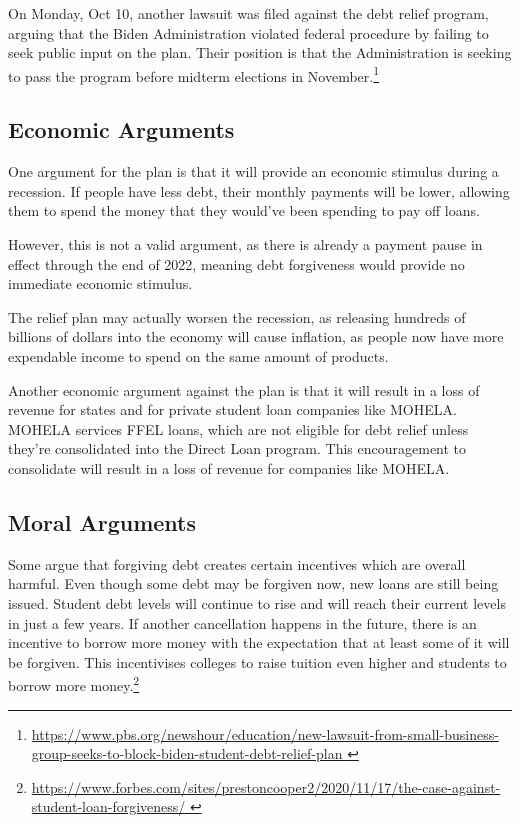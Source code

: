 \documentclass{../khw}
\begin{document}
On Monday, Oct 10, another lawsuit was filed against the debt
relief program, arguing that the Biden Administration violated federal procedure
by failing to seek public input on the plan. Their position is that the
Administration is seeking to pass the program before midterm elections in
November.\footnote{\url{
    https://www.pbs.org/newshour/education/new-lawsuit-from-small-business-group-seeks-to-block-biden-student-debt-relief-plan
}}

\subsection{Economic Arguments}

One argument for the plan is that it will provide an economic stimulus during a
recession. If people have less debt, their monthly payments will be lower,
allowing them to spend the money that they would've been spending to pay off
loans.

However, this is not a valid argument, as there is already a payment pause in
effect through the end of 2022, meaning debt forgiveness would provide no
immediate economic stimulus.

The relief plan may actually worsen the
recession, as releasing hundreds of billions of dollars into the economy will
cause inflation, as people now have more expendable income to spend on the same
amount of products.

Another economic argument against the plan is that it will result in a loss of
revenue for states and for private student loan companies like MOHELA. MOHELA
services FFEL loans, which are not eligible for debt relief unless they're
consolidated into the Direct Loan program. This encouragement to consolidate
will result in a loss of revenue for companies like MOHELA.

\subsection{Moral Arguments}

Some argue that forgiving debt creates certain incentives which are overall
harmful. Even though some debt may be forgiven now, new loans are still being
issued. Student debt levels will continue to rise and will reach their current
levels in just a few years. If another cancellation happens in the future, there
is an incentive to borrow more money with the expectation that at least some of
it will be forgiven. This incentivises colleges to raise tuition even higher and
students to borrow more money.\footnote{\url{
    https://www.forbes.com/sites/prestoncooper2/2020/11/17/the-case-against-student-loan-forgiveness/
}}
\end{document}

